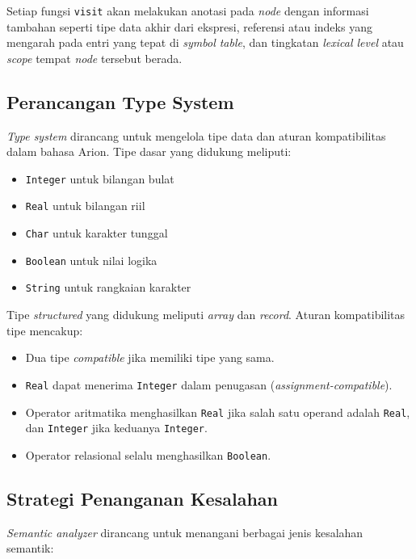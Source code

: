 ﻿\documentclass[12pt,a4paper]{article}
\begin{document}
Setiap fungsi \texttt{visit} akan melakukan anotasi pada \textit{node} dengan informasi tambahan seperti tipe data akhir dari ekspresi, referensi atau indeks yang mengarah pada entri yang tepat di \textit{symbol table}, dan tingkatan \textit{lexical level} atau \textit{scope} tempat \textit{node} tersebut berada.

\subsection{Perancangan Type System}

\textit{Type system} dirancang untuk mengelola tipe data dan aturan kompatibilitas dalam bahasa Arion. Tipe dasar yang didukung meliputi:

\begin{itemize}
    \item \texttt{Integer} untuk bilangan bulat
    \item \texttt{Real} untuk bilangan riil
    \item \texttt{Char} untuk karakter tunggal
    \item \texttt{Boolean} untuk nilai logika
    \item \texttt{String} untuk rangkaian karakter
\end{itemize}

Tipe \textit{structured} yang didukung meliputi \textit{array} dan \textit{record}. Aturan kompatibilitas tipe mencakup:
\begin{itemize}
    \item Dua tipe \textit{compatible} jika memiliki tipe yang sama.
    \item \texttt{Real} dapat menerima \texttt{Integer} dalam penugasan (\textit{assignment-compatible}).
    \item Operator aritmatika menghasilkan \texttt{Real} jika salah satu operand adalah \texttt{Real}, dan \texttt{Integer} jika keduanya \texttt{Integer}.
    \item Operator relasional selalu menghasilkan \texttt{Boolean}.
\end{itemize}

\subsection{Strategi Penanganan Kesalahan}

\textit{Semantic analyzer} dirancang untuk menangani berbagai jenis kesalahan semantik:
\end{document}
